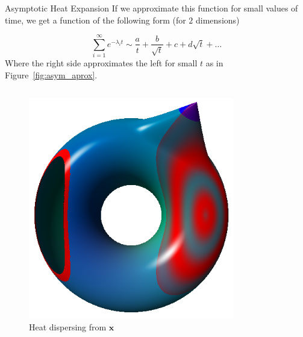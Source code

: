 \documentclass[final]{beamer}
\newlength{\onecolwid}
\begin{document}
\begin{frame}[t]
\begin{columns}[t]
\begin{column}{\onecolwid}
\begin{block}{Asymptotic Heat Expansion}
        If we approximate this function for small values of time, we get a
        function of the following form (for $2$ dimensions)

        \begin{equation*}
            \sum_{i=1}^{\infty}e^{-\lambda_i t} \sim
            \frac{a}{t}+\frac{b}{\sqrt{t}}+c+d\sqrt{t}+\dots
        \end{equation*}
        Where the right side approximates the left for small $t$ as in
        Figure~\ref{fig:asym_aprox}.
   
        \begin{columns}[t]
        \begin{column}[c]{0.43\textwidth}
        \begin{figure}
        \includegraphics[width=\textwidth]{images/heat_ex.png}
        \caption{Heat dispersing from $\mathbf{x}$}
        \label{fig:heat_ex}
        \end{figure}
        \end{column}
        \begin{column}[c]{0.55\textwidth}
        \begin{figure}

\end{figure}
\end{column}
\end{columns}
\end{block}
\end{column}
\end{columns}
\end{frame}
\end{document}
